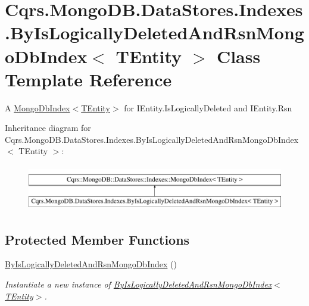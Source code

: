 \hypertarget{classCqrs_1_1MongoDB_1_1DataStores_1_1Indexes_1_1ByIsLogicallyDeletedAndRsnMongoDbIndex}{}\section{Cqrs.\+Mongo\+D\+B.\+Data\+Stores.\+Indexes.\+By\+Is\+Logically\+Deleted\+And\+Rsn\+Mongo\+Db\+Index$<$ T\+Entity $>$ Class Template Reference}
\label{classCqrs_1_1MongoDB_1_1DataStores_1_1Indexes_1_1ByIsLogicallyDeletedAndRsnMongoDbIndex}


A \hyperlink{classCqrs_1_1MongoDB_1_1DataStores_1_1Indexes_1_1MongoDbIndex_a61f4b17dd968f92e81562c70ae062a89_a61f4b17dd968f92e81562c70ae062a89}{Mongo\+Db\+Index$<$\+T\+Entity$>$} for I\+Entity.\+Is\+Logically\+Deleted and I\+Entity.\+Rsn  


Inheritance diagram for Cqrs.\+Mongo\+D\+B.\+Data\+Stores.\+Indexes.\+By\+Is\+Logically\+Deleted\+And\+Rsn\+Mongo\+Db\+Index$<$ T\+Entity $>$\+:\begin{figure}[H]
\begin{center}
\leavevmode
\includegraphics[height=2.000000cm]{classCqrs_1_1MongoDB_1_1DataStores_1_1Indexes_1_1ByIsLogicallyDeletedAndRsnMongoDbIndex}
\end{center}
\end{figure}
\subsection*{Protected Member Functions}
\begin{DoxyCompactItemize}
\item 
\hyperlink{classCqrs_1_1MongoDB_1_1DataStores_1_1Indexes_1_1ByIsLogicallyDeletedAndRsnMongoDbIndex_add37df2db333254d1489f13cd9a668a1_add37df2db333254d1489f13cd9a668a1}{By\+Is\+Logically\+Deleted\+And\+Rsn\+Mongo\+Db\+Index} ()
\begin{DoxyCompactList}\small\item\em Instantiate a new instance of \hyperlink{classCqrs_1_1MongoDB_1_1DataStores_1_1Indexes_1_1ByIsLogicallyDeletedAndRsnMongoDbIndex_add37df2db333254d1489f13cd9a668a1_add37df2db333254d1489f13cd9a668a1}{By\+Is\+Logically\+Deleted\+And\+Rsn\+Mongo\+Db\+Index$<$\+T\+Entity$>$}. \end{DoxyCompactList}\end{DoxyCompactItemize}
